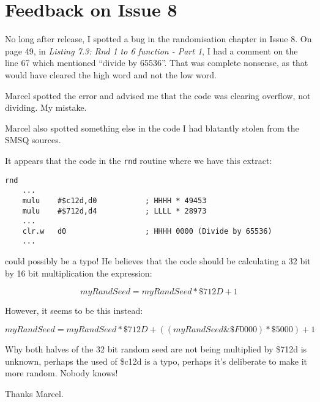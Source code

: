 \chapter{Feedback on Issue 8}

No long after release, I spotted a bug in the randomisation chapter
in Issue 8. On page 49, in \emph{Listing 7.3: Rnd 1 to 6 function
- Part 1}, I had a comment on the line 67 which mentioned ``divide
by 65536''. That was complete nonsense, as that would have cleared
the high word and not the low word. 

Marcel spotted the error and advised me that the code was clearing
overflow, not dividing. My mistake.

Marcel also spotted something else in the code I had blatantly stolen
from the SMSQ sources.

It appears that the code in the \lstinline[basicstyle={\ttfamily}]!rnd!
routine where we have this extract:

\begin{lstlisting}[caption={Rnd 1 to 6 function - Part 1},numbers=none]
rnd
    ...
    mulu    #$c12d,d0           ; HHHH * 49453
    mulu    #$712d,d4           ; LLLL * 28973
	...
    clr.w   d0                  ; HHHH 0000 (Divide by 65536)
	...
\end{lstlisting}

could possibly be a typo! He believes that the code should be calculating
a 32 bit by 16 bit multiplication \textendash{} the expression:

\[
myRandSeed=myRandSeed*\$712D+1
\]

However, it seems to be this instead:

\[
myRandSeed=myRandSeed*\$712D+\left(\left(myRandSeed\&\$F0000\right)*\$5000\right)+1
\]

Why both halves of the 32 bit random seed are not being multiplied
by \$712d is unknown, perhaps the used of \$c12d is a typo, perhaps
it's deliberate to make it more random. Nobody knows!

Thanks Marcel.
